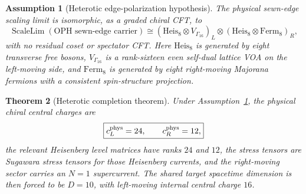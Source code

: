 \documentclass[11pt]{article}
\newtheorem{theorem}{Theorem}[section]
\newtheorem{assumption}[theorem]{Assumption}
\theoremstyle{remark}
\theoremstyle{plain}
\begin{document}
\begin{assumption}[Heterotic edge-polarization hypothesis]\label{ass:heterotic-edge-polarization}
The physical sewn-edge scaling limit is isomorphic, as a graded chiral CFT, to
\[
\operatorname{ScaleLim}(\text{OPH sewn-edge carrier})
\cong
\left(\mathrm{Heis}_8\otimes V_{\Gamma_{16}}\right)_L
\otimes
\left(\mathrm{Heis}_8\otimes \mathrm{Ferm}_8\right)_R,
\]
with no residual coset or spectator CFT. Here \(\mathrm{Heis}_8\) is generated by eight transverse
free bosons, \(V_{\Gamma_{16}}\) is a rank-sixteen even self-dual lattice VOA on the left-moving
side, and \(\mathrm{Ferm}_8\) is generated by eight right-moving Majorana fermions with a
consistent spin-structure projection.
\end{assumption}

\begin{theorem}[Heterotic completion theorem]
Under Assumption~\ref{ass:heterotic-edge-polarization}, the physical chiral central charges are
\[
\boxed{c_L^{\rm phys}=24,\qquad c_R^{\rm phys}=12,}
\]
the relevant Heisenberg level matrices have ranks \(24\) and \(12\), the stress tensors are
Sugawara stress tensors for those Heisenberg currents, and the right-moving sector carries an
\(N=1\) supercurrent. The shared target spacetime dimension is then forced to be \(D=10\), with
left-moving internal central charge \(16\).
\end{theorem}
\end{document}
